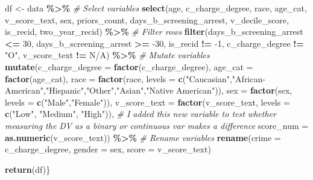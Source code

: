 \documentclass[
]{book}
\newenvironment{Shaded}{\begin{snugshade}}{\end{snugshade}}
\newcommand{\CommentTok}[1]{\textcolor[rgb]{0.56,0.35,0.01}{\textit{#1}}}
\newcommand{\DataTypeTok}[1]{\textcolor[rgb]{0.13,0.29,0.53}{#1}}
\newcommand{\DecValTok}[1]{\textcolor[rgb]{0.00,0.00,0.81}{#1}}
\newcommand{\KeywordTok}[1]{\textcolor[rgb]{0.13,0.29,0.53}{\textbf{#1}}}
\newcommand{\NormalTok}[1]{#1}
\newcommand{\OperatorTok}[1]{\textcolor[rgb]{0.81,0.36,0.00}{\textbf{#1}}}
\newcommand{\StringTok}[1]{\textcolor[rgb]{0.31,0.60,0.02}{#1}}
\begin{document}
\begin{Shaded}
\begin{Highlighting}[]
\NormalTok{df \textless{}{-}}\StringTok{ }\NormalTok{data }\OperatorTok{\%\textgreater{}\%}\StringTok{ }
\StringTok{    }
\StringTok{    }\CommentTok{\# Select variables }
\StringTok{    }\KeywordTok{select}\NormalTok{(age, c\_charge\_degree, race, age\_cat, v\_score\_text, sex, priors\_count, }
\NormalTok{         days\_b\_screening\_arrest, v\_decile\_score, is\_recid, two\_year\_recid) }\OperatorTok{\%\textgreater{}\%}\StringTok{            }
\StringTok{    }\CommentTok{\# Filter rows }
\StringTok{    }\KeywordTok{filter}\NormalTok{(days\_b\_screening\_arrest }\OperatorTok{\textless{}=}\StringTok{ }\DecValTok{30}\NormalTok{,}
\NormalTok{           days\_b\_screening\_arrest }\OperatorTok{\textgreater{}=}\StringTok{ }\DecValTok{{-}30}\NormalTok{, }
\NormalTok{           is\_recid }\OperatorTok{!=}\StringTok{ }\DecValTok{{-}1}\NormalTok{,}
\NormalTok{           c\_charge\_degree }\OperatorTok{!=}\StringTok{ "O"}\NormalTok{,}
\NormalTok{           v\_score\_text }\OperatorTok{!=}\StringTok{ \textquotesingle{}N/A\textquotesingle{}}\NormalTok{) }\OperatorTok{\%\textgreater{}\%}\StringTok{ }
\StringTok{    }\CommentTok{\# Mutate variables }
\StringTok{    }\KeywordTok{mutate}\NormalTok{(}\DataTypeTok{c\_charge\_degree =} \KeywordTok{factor}\NormalTok{(c\_charge\_degree),}
           \DataTypeTok{age\_cat =} \KeywordTok{factor}\NormalTok{(age\_cat),}
           \DataTypeTok{race =} \KeywordTok{factor}\NormalTok{(race, }\DataTypeTok{levels =} \KeywordTok{c}\NormalTok{(}\StringTok{"Caucasian"}\NormalTok{,}\StringTok{"African{-}American"}\NormalTok{,}\StringTok{"Hispanic"}\NormalTok{,}\StringTok{"Other"}\NormalTok{,}\StringTok{"Asian"}\NormalTok{,}\StringTok{"Native American"}\NormalTok{)),}
           \DataTypeTok{sex =} \KeywordTok{factor}\NormalTok{(sex, }\DataTypeTok{levels =} \KeywordTok{c}\NormalTok{(}\StringTok{"Male"}\NormalTok{,}\StringTok{"Female"}\NormalTok{)),}
           \DataTypeTok{v\_score\_text =} \KeywordTok{factor}\NormalTok{(v\_score\_text, }\DataTypeTok{levels =} \KeywordTok{c}\NormalTok{(}\StringTok{"Low"}\NormalTok{, }\StringTok{"Medium"}\NormalTok{, }\StringTok{"High"}\NormalTok{)),}
\CommentTok{\# I added this new variable to test whether measuring the DV as a binary or continuous var makes a difference }
           \DataTypeTok{score\_num =} \KeywordTok{as.numeric}\NormalTok{(v\_score\_text)) }\OperatorTok{\%\textgreater{}\%}
\StringTok{    }\CommentTok{\# Rename variables }
\StringTok{    }\KeywordTok{rename}\NormalTok{(}\DataTypeTok{crime =}\NormalTok{ c\_charge\_degree,}
           \DataTypeTok{gender =}\NormalTok{ sex,}
           \DataTypeTok{score =}\NormalTok{ v\_score\_text)}
        
\KeywordTok{return}\NormalTok{(df)\}}
\end{Highlighting}
\end{Shaded}
\end{document}
